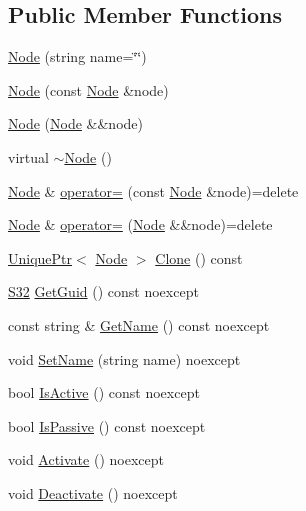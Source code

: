 \subsection*{Public Member Functions}
\begin{DoxyCompactItemize}
\item 
\hyperlink{classmage_1_1_node_a6638b75608b2b340743a0a639230492d}{Node} (string name=\char`\"{}\char`\"{})
\item 
\hyperlink{classmage_1_1_node_af9da591163469f210895f3a5b389d7cc}{Node} (const \hyperlink{classmage_1_1_node}{Node} \&node)
\item 
\hyperlink{classmage_1_1_node_adbc40b6c4100f74faa2b59a7a0b79388}{Node} (\hyperlink{classmage_1_1_node}{Node} \&\&node)
\item 
virtual \hyperlink{classmage_1_1_node_a1369fc11b331abacbaf11aeb5729e871}{$\sim$\+Node} ()
\item 
\hyperlink{classmage_1_1_node}{Node} \& \hyperlink{classmage_1_1_node_ad10ea13608963acfa06d3c1577314da5}{operator=} (const \hyperlink{classmage_1_1_node}{Node} \&node)=delete
\item 
\hyperlink{classmage_1_1_node}{Node} \& \hyperlink{classmage_1_1_node_a007043de35c65edb9a0d790824186151}{operator=} (\hyperlink{classmage_1_1_node}{Node} \&\&node)=delete
\item 
\hyperlink{namespacemage_a3316d7143a973e37adf1110f2e80ca31}{Unique\+Ptr}$<$ \hyperlink{classmage_1_1_node}{Node} $>$ \hyperlink{classmage_1_1_node_a18e08151571435d319be2414474c93c0}{Clone} () const
\item 
\hyperlink{namespacemage_a642e05c5c83642b6946703615cdbf2da}{S32} \hyperlink{classmage_1_1_node_a41474294afb1064796ff8a75413734f3}{Get\+Guid} () const noexcept
\item 
const string \& \hyperlink{classmage_1_1_node_a206e7c7ef80a0561b31ebbb9d05c98a0}{Get\+Name} () const noexcept
\item 
void \hyperlink{classmage_1_1_node_a78e4ef8457d200662d2f4881cef08688}{Set\+Name} (string name) noexcept
\item 
bool \hyperlink{classmage_1_1_node_a6fce6afdcfdde0e5dff5b219cee4f372}{Is\+Active} () const noexcept
\item 
bool \hyperlink{classmage_1_1_node_a5fb6ac39c7e0d630944594cd5426f61a}{Is\+Passive} () const noexcept
\item 
void \hyperlink{classmage_1_1_node_aefa62a09afd2b0d314a64e6d45f45a34}{Activate} () noexcept
\item 
void \hyperlink{classmage_1_1_node_afb4de0bc346a435745facfbdeda4ac6a}{Deactivate} () noexcept

\end{DoxyCompactItemize}

